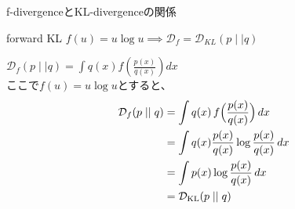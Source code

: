 \begin{frame}{f-divergenceとKL-divergenceの関係}
    \begin{exampleblock}{forward KL}
        \centering$\mathit{f}(u)=u\log u \implies \mathcal{D}_{f}=\mathcal{D}_{KL}(p\mid\mid q)$\\
    \end{exampleblock}
    \begin{exampleblock}{}
    \centering$ \mathcal{D}_{f}(p\mid\mid q)=\int q(x)\mathit{f}\left(\frac{p(x)}{q(x)}\right)dx$\\
    \centering ここで$\mathit{f}(u)=u\log u$とすると、\\
    \begin{align*}
        \mathcal{D}_{f}(p\mid\mid q)
        &= \int q(x)\,f\Bigl(\frac{p(x)}{q(x)}\Bigr)\,dx \\
        &= \int q(x)\frac{p(x)}{q(x)}\log\frac{p(x)}{q(x)}\,dx \\
        &= \int p(x)\log\frac{p(x)}{q(x)}\,dx \\
        &= \mathcal{D}_{\mathrm{KL}}(p\mid\mid q)
    \end{align*}
    \end{exampleblock}
\end{frame}


